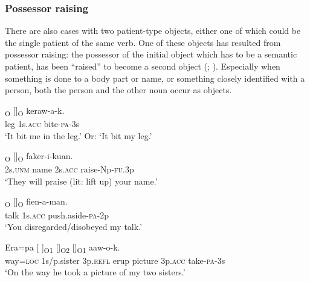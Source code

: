 \subsubsection[Possessor raising]{Possessor raising}
{}
There are also cases with two patient-type objects, either one of which could be the single patient of the same verb. One of these objects has resulted from possessor raising: the possessor of the initial object  which has to be a semantic patient, has been ``raised'' to become a second object (\citealt[258]{VanValinEtAl1997}; \citealt[194--196]{Payne1997}). Especially when something is done to a body part or name, or something closely identified with a person, both the person and the other noun occur as objects.

\ea%
\label{ex:x951}
\textsubscript{O} []\textsubscript{O}  keraw-a-k. \\
     leg  1s.\textsc{acc}  bite-\textsc{pa}-3s \\
\glt `It bit me in the leg.' Or: `It bit my leg.'
\z

\ea%
\label{ex:x952}
\textsubscript{O}  []\textsubscript{O}  faker-i-kuan. \\
     2s.\textsc{unm}  name  2s.\textsc{acc}  raise-Np-\textsc{fu}.3p \\
\glt `They will praise (lit: lift up) your name.'
\z

\ea%
\label{ex:x957}
\textsubscript{O}  []\textsubscript{O}  fien-a-man. \\
     talk  1s.\textsc{acc}  push.aside-\textsc{pa}-2p \\
\glt `You disregarded/disobeyed my talk.'
\z

\ea%
\label{ex:x948}
\gll Era=pa  [  ]\textsubscript{O1}  []\textsubscript{O2}  []\textsubscript{O1} aaw-o-k. \\
     way=\textsc{loc}  1s/p.sister  3p.\textsc{refl}  erup  picture  3p.\textsc{acc} take-\textsc{pa}-3s \\
\glt `On the way he took a picture of my two sisters.'
\z

